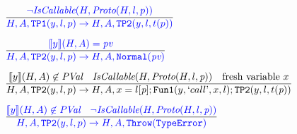 \documentclass[a4paper, leqno]{amsart}
\newcommand{\squote}[1]{\text{`}#1\text{'}}
\def\inblue{\color{blue}}
\newcommand{\te}{{\tt TypeError}}
\newcommand{\pval}{\emph{PVal}}
\newcommand{\pv}{\emph{pv}}
\newcommand{\pn}{\emph{p}}
\newcommand{\sem}[1]{\ensuremath{\llbracket #1 \rrbracket}}
\newcommand{\semd}[1]{\ensuremath{\sem{#1}(H, A)}}
\begin{document}
\[\begin{array}{l@{}l@{}ll}
 & \ \ & \frac{
    \begin{matrix}\inblue
       \neg \emph{IsCallable}(H,\emph{Proto}(H,l,p))
    \end{matrix}}{
    \begin{matrix}\inblue
       H,A,{\tt TP1}(y,l,p) \rightarrow H,A,{\tt TP2}(y,l,t(p))
    \end{matrix}} & \\[1.5em]

 & \ \ & \frac{
    \begin{matrix}\inblue
       \semd{y} = \pv &
    \end{matrix}}{
    \begin{matrix}\inblue
       H,A,{\tt TP2}(y,l,p) \rightarrow H,A,{\tt Normal}(\pv)
    \end{matrix}} & \\[1.5em]

 & \ \ & \frac{
    \begin{matrix}
       \semd{y} \not\in \pval &
       \emph{IsCallable}(H,\emph{Proto}(H,l,\pn)) &
       \mbox{fresh variable }x
    \end{matrix}}{
    \begin{matrix}
       H,A,{\tt TP2}(y,l,p) \rightarrow H,A,x=l[\pn]; {\tt Fun1}(y,\squote{call},x,l); {\tt TP2}(y,l,t(\pn))
    \end{matrix}} & \\[1.5em]

 & \ \ & \frac{\inblue
    \begin{matrix}
       \semd{y} \not\in \pval &
       \neg \emph{IsCallable}(H,\emph{Proto}(H,l,\pn))
    \end{matrix}}{
    \begin{matrix}\inblue
       H,A,{\tt TP2}(y,l,p) \rightarrow H,A,{\tt Throw(\te)}
    \end{matrix}} & \\
 \end{array}
\]
\end{document}
